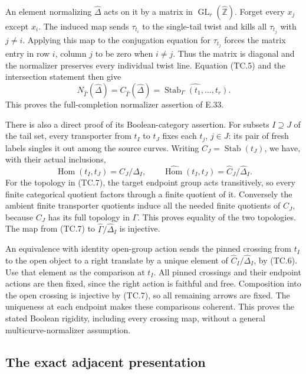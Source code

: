 An element normalizing $\widehat\Delta$ acts on it by a matrix in
$\operatorname{GL}_r(\widehat{\mathbb Z})$.  Forget every $x_j$
except $x_i$.  The induced map sends $\tau_{t_i}$ to the single-tail
twist and kills all $\tau_{t_j}$ with $j\ne i$.
Applying this map to the conjugation equation for $\tau_{t_j}$ forces
the matrix entry in row $i$, column $j$ to be zero when $i\ne j$.
Thus the matrix is diagonal and the normalizer preserves every
individual twist line.  Equation (TC.5) and the intersection statement
then give
\[
 N_{\widehat\Gamma}(\widehat\Delta)
 =C_{\widehat\Gamma}(\widehat\Delta)
 =\widehat{\operatorname{Stab}_\Gamma(t_1,\ldots,t_r)}.
                                                               \tag{TC.6}
\]
This proves the full-completion normalizer assertion of E.33.

There is also a direct proof of its Boolean-category assertion.  For
subsets $I\supseteq J$ of the tail set, every transporter from $t_I$
to $t_J$ fixes each $t_j$, $j\in J$: its pair of fresh labels singles
it out among the source curves.  Writing $C_J=\operatorname{Stab}(t_J)$,
we have, with their actual inclusions,
\[
 \operatorname{Hom}(t_I,t_J)=C_J/\Delta_I,
 \qquad
 \widehat{\operatorname{Hom}}(t_I,t_J)
                       =\widehat C_J/\widehat\Delta_I.       \tag{TC.7}
\]
For the topology in (TC.7), the target endpoint group acts transitively,
so every finite categorical quotient factors through a finite quotient
of it.  Conversely the ambient finite transporter quotients induce
all the needed finite quotients of $C_J$, because $C_J$ has its full
topology in $\Gamma$.  This proves equality of the two topologies.
The map from (TC.7) to $\widehat\Gamma/\widehat\Delta_I$ is injective.

An equivalence with identity open-group action sends the pinned crossing
from $t_I$ to the open object to a right translate by a unique element
of $\widehat C_I/\widehat\Delta_I$, by (TC.6).  Use that element as
the comparison at $t_I$.  All pinned crossings and their endpoint
actions are then fixed, since the right action is faithful and free.
Composition into the open crossing is injective by (TC.7), so all
remaining arrows are fixed.  The uniqueness at each endpoint makes
these comparisons coherent.  This proves the stated Boolean rigidity,
including every crossing map, without a general multicurve-normalizer
assumption.

\subsection{The exact adjacent presentation}

